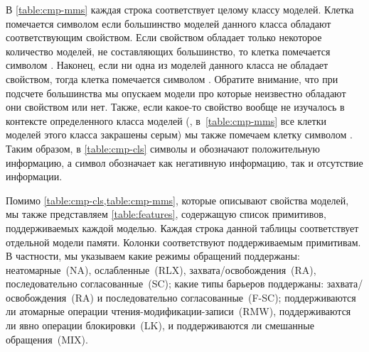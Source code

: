 В \cref{table:cmp-mms} каждая строка соответствует целому классу моделей. 
Клетка помечается символом \cmark\xspace если большинство моделей 
данного класса обладают соответствующим свойством. 
Если свойством обладает только некоторое количество моделей, 
не составляющих большинство, то клетка помечается символом \wmark\xspace.
Наконец, если ни одна из моделей данного класса не обладает свойством, 
тогда клетка помечается символом \xmark\xspace.
Обратите внимание, что при подсчете большинства 
мы опускаем модели про которые неизвестно обладают 
они свойством или нет. 
Также, если какое-то свойство вообще не изучалось 
в контексте определенного класса моделей 
(\ie, в~\cref{table:cmp-mms} все клетки моделей этого класса закрашены серым)
мы также помечаем клетку символом \xmark. 
Таким образом, в \cref{table:cmp-cls} символы \cmark\xspace и \wmark\xspace 
обозначают положительную информацию, а символ \xmark\xspace обозначает 
как негативную информацию, так и отсутствие информации. 

Помимо \cref{table:cmp-cls,table:cmp-mms}, 
которые описывают свойства моделей, мы также 
представляем \cref{table:features}, содержащую 
список примитивов, поддерживаемых каждой моделью. 
Каждая строка данной таблицы соответствует отдельной модели памяти.
Колонки соответствуют поддерживаемым примитивам. 
В частности, мы указываем какие режимы обращений поддержаны:
неатомарные~(NA), ослабленные~(RLX), захвата/освобождения~(RA), 
последовательно согласованные~(SC); 
какие типы барьеров поддержаны:
захвата/освобождения~(RA) и последовательно согласованные~(F-SC);
поддерживаются ли атомарные операции чтения-модификации-записи~(RMW),
поддерживаются ли явно операции блокировки~(LK),
и поддерживаются ли смешанные обращения~(MIX).   





